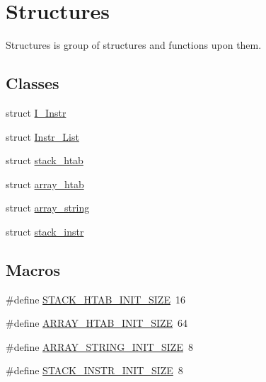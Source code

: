 \hypertarget{group__structures}{}\section{Structures}
\label{group__structures}


Structures is group of structures and functions upon them.  


\subsection*{Classes}
\begin{DoxyCompactItemize}
\item 
struct \hyperlink{structI__Instr}{I\+\_\+\+Instr}
\item 
struct \hyperlink{structInstr__List}{Instr\+\_\+\+List}
\item 
struct \hyperlink{structstack__htab}{stack\+\_\+htab}
\item 
struct \hyperlink{structarray__htab}{array\+\_\+htab}
\item 
struct \hyperlink{structarray__string}{array\+\_\+string}
\item 
struct \hyperlink{structstack__instr}{stack\+\_\+instr}
\end{DoxyCompactItemize}
\subsection*{Macros}
\begin{DoxyCompactItemize}
\item 
\#define \hyperlink{group__structures_gaacafe24c4bd0e04c93bd17e8c669f47a}{S\+T\+A\+C\+K\+\_\+\+H\+T\+A\+B\+\_\+\+I\+N\+I\+T\+\_\+\+S\+I\+ZE}~16
\item 
\#define \hyperlink{group__structures_ga883c53765dfed4030e94f8f0d06aa126}{A\+R\+R\+A\+Y\+\_\+\+H\+T\+A\+B\+\_\+\+I\+N\+I\+T\+\_\+\+S\+I\+ZE}~64
\item 
\#define \hyperlink{group__structures_ga188b77e9f97cdfd9919e4270f26a5f0f}{A\+R\+R\+A\+Y\+\_\+\+S\+T\+R\+I\+N\+G\+\_\+\+I\+N\+I\+T\+\_\+\+S\+I\+ZE}~8
\item 
\#define \hyperlink{group__structures_ga132b2787e64d54f69abb3d2f6efa5378}{S\+T\+A\+C\+K\+\_\+\+I\+N\+S\+T\+R\+\_\+\+I\+N\+I\+T\+\_\+\+S\+I\+ZE}~8
\end{DoxyCompactItemize}
